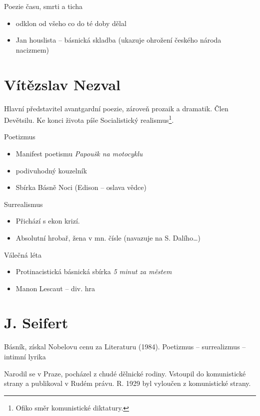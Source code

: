 \documentclass[10pt,a4page,headings,openany,%
oneside
,twocolumn
]{report}
\begin{document}
\textsf{Poezie času, smrti a ticha}
\begin{itemize}
\item odklon od všeho co do té doby dělal
\item Jan houslista -- básnická skladba (ukazuje ohrožení českého národa nacizmem)
\end{itemize}

\section{Vítězslav Nezval}
Hlavní představitel avantgardní poezie, zároveň prozaik a dramatik. Člen Devětsilu. Ke konci života píše Socialistický realismus\footnote{Ofiko směr komunistické diktatury.}.


\textsf{Poetizmus}
\begin{itemize}
\item Manifest poetismu \emph{Papoušk na motocyklu}
\item podivuhodný kouzelník
\item Sbírka Básně Noci (Edison -- oslava vědce)
\end{itemize}

\textsf{Surrealismus}
\begin{itemize}
\item Přichází s ekon krizí.
\item Absolutní hrobař, žena v mn. čísle (navazuje na S. Dalího\dots)
\end{itemize}


\textsf{Válečná léta}
\begin{itemize}
\item Protinacistická básnická sbírka \emph{5 minut za městem}
\item Manon Lescaut -- div. hra
\end{itemize}

\section{J. Seifert}

Básník, získal Nobelovu cenu za Literaturu (1984). Poetizmus -- surrealizmus -- intimní lyrika

Narodil se v Praze, pocházel z chudé dělnické rodiny. Vstoupil do komunistické strany a publikoval v Rudém právu. R. 1929 byl vyloučen z komunistické strany.
\end{document}
